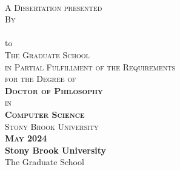 \documentclass[
11pt, %
oneside, %
english, %
singlespacing, %
liststotoc, %
headsepline, %
]{MastersDoctoralThesis} %
\author{Caitao Zhan} %
\begin{document}
\frontmatter %

\pagestyle{plain} %


\begin{center}
    
  \thispagestyle{empty}
  {\large \textsc{\textbf{\ttitle}}}  \\
  \vspace{0.9cm}
  \textsc{A Dissertation presented}  \\
  \vspace{0.45cm}
  \textsc{By}  \\
  \vspace{0.45cm}
  {\large \textsc{\textbf{\authorname}}}  \\
  \vspace{0.9cm}
  to  \\
  \vspace{0.45cm}
  \textsc{The Graduate School}  \\
  \vspace{0.45cm}
  \textsc{in Partial Fulfillment of the Requirements}  \\
  \vspace{0.45cm}
  \textsc{for the Degree of}  \\
  \vspace{0.45cm}
  \textsc{\textbf{Doctor of Philosophy}}  \\
  \vspace{0.45cm}
  \textsc{in}  \\
  \vspace{0.45cm}
  \textsc{\textbf{Computer Science}}  \\
  \vspace{1.2cm}
  \textsc{Stony Brook University}  \\
  \vspace{1.2cm}
  \textsc{\textbf{May 2024}}  \\
  \eject 
  \setcounter{page}{2}
  {\large \textbf{Stony Brook University}}  \\
  \vspace{0.25cm}
  The Graduate School  \\

\end{center}
\end{document}

